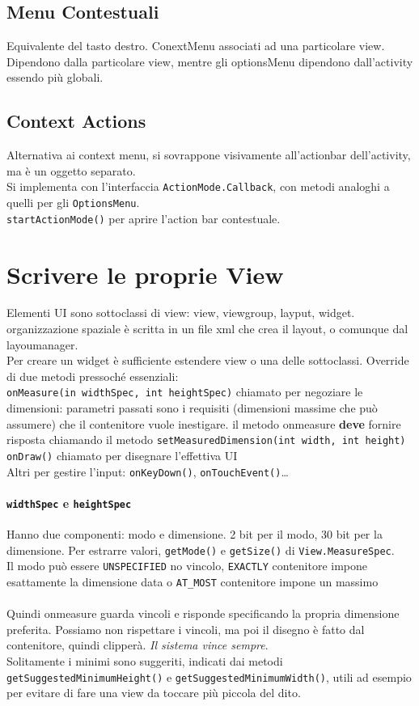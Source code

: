 \documentclass[10pt]{book}
\begin{document}
\subsection{Menu Contestuali}
Equivalente del tasto destro. ConextMenu associati ad una particolare view. Dipendono dalla particolare view, mentre gli optionsMenu dipendono dall'activity essendo più globali.\\
\subsection{Context Actions}
Alternativa ai context menu, si sovrappone visivamente all'actionbar dell'activity, ma è un oggetto separato.\\
Si implementa con l'interfaccia \texttt{ActionMode.Callback}, con metodi analoghi a quelli per gli \texttt{OptionsMenu}.\\
\texttt{startActionMode()} per aprire l'action bar contestuale.
\section{Scrivere le proprie View}
Elementi UI sono sottoclassi di view: view, viewgroup, layput, widget. organizzazione spaziale è scritta in un file xml che crea il layout, o comunque dal layoumanager.\\
Per creare un widget è sufficiente estendere view o una delle sottoclassi. Override di due metodi pressoché essenziali:\\
\texttt{onMeasure(in widthSpec, int heightSpec)} chiamato per negoziare le dimensioni: parametri passati sono i requisiti (dimensioni massime che può assumere) che il contenitore vuole inestigare. il metodo onmeasure \textbf{deve} fornire risposta chiamando il metodo \texttt{setMeasuredDimension(int width, int height)}\\
\texttt{onDraw()} chiamato per disegnare l'effettiva UI\\
Altri per gestire l'input: \texttt{onKeyDown()}, \texttt{onTouchEvent()}\ldots\\

\paragraph{\texttt{widthSpec} e \texttt{heightSpec}} Hanno due componenti: modo e dimensione. 2 bit per il modo, 30 bit per la dimensione. Per estrarre valori, \texttt{getMode()} e \texttt{getSize()} di \texttt{View.MeasureSpec}.\\
Il modo può essere \texttt{UNSPECIFIED} no vincolo, \texttt{EXACTLY} contenitore impone esattamente la dimensione data o \texttt{AT\_MOST} contenitore impone un massimo\\\\
Quindi onmeasure guarda vincoli e risponde specificando la propria dimensione preferita. Possiamo non rispettare i vincoli, ma poi il disegno è fatto dal contenitore, quindi clipperà. \textit{Il sistema vince sempre}.\\
Solitamente i minimi sono suggeriti, indicati dai metodi \texttt{getSuggestedMinimumHeight()} e \texttt{getSuggestedMinimumWidth()}, utili ad esempio per evitare di fare una view da toccare più piccola del dito.
\end{document}
